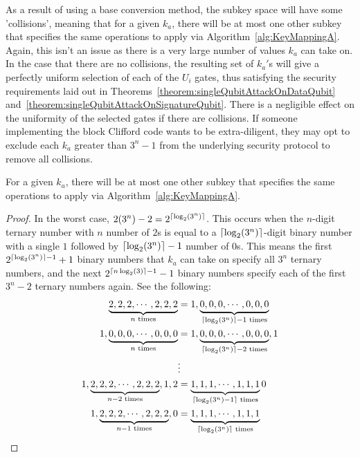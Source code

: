 As a result of using a base conversion method, the subkey space will have some 'collisions', meaning that for a given $k_a$, there will be at most one other subkey that specifies the same operations to apply via Algorithm~\ref{alg:KeyMappingA}. Again, this isn't an issue as there is a very large number of values $k_a$ can take on. In the case that there are no collisions, the resulting set of $k_a'$s will give a perfectly uniform selection of each of the $U_i$ gates, thus satisfying the security requirements laid out in Theorems~\ref{theorem:singleQubitAttackOnDataQubit} and~\ref{theorem:singleQubitAttackOnSignatureQubit}. There is a negligible effect on the uniformity of the selected gates if there are collisions. If someone implementing the block Clifford code wants to be extra-diligent, they may opt to exclude each $k_a$ greater than $3^n - 1$ from the underlying security protocol to remove all collisions.

\begin{theorem}
\label{theorem:collisionForMappingA}
For a given $k_a$, there will be at most one other subkey that specifies the same operations to apply via Algorithm~\ref{alg:KeyMappingA}.
\end{theorem}
\begin{proof}
In the worst case, $2(3^n) - 2 = 2^{\lceil\log_2 (3^n)\rceil}$. This occurs when the $n$-digit ternary number with $n$ number of $2$s is equal to a $\lceil\log_2 (3^n)\rceil$-digit binary number with a single $1$ followed by $\lceil\log_2 (3^n)\rceil - 1$ number of $0$s. This means the first $2^{\lceil\log_2 (3^n)\rceil - 1} + 1$ binary numbers that $k_a$ can take on specify all $3^n$ ternary numbers, and the next $2^{\lceil n \log_2 (3)\rceil - 1} - 1$ binary numbers specify each of the first $3^n - 2$ ternary numbers again. See the following:
\begin{align}
\underbrace{2, 2, 2, \cdots ,2,2,2}_{n \text{ times}} &= 1, \underbrace{0, 0, 0, \cdots ,0,0,0}_{\lceil\log_2 (3^n)\rceil - 1 \text{ times}}\\
1,\underbrace{0, 0, 0, \cdots ,0,0,0}_{n \text{ times}} &= 1, \underbrace{0, 0, 0, \cdots ,0,0,0}_{\lceil\log_2 (3^n)\rceil - 2 \text{ times}}, 1\\
& \vdots \nonumber \\
1, \underbrace{2, 2, 2, \cdots ,2,2,2}_{n-2 \text{ times}}, 1,2 &= \underbrace{1, 1, 1, \cdots ,1,1,1}_{\lceil\log_2 (3^n) - 1\rceil\text{ times}} 0\\
1, \underbrace{2, 2, 2, \cdots ,2,2,2}_{n-1 \text{ times}}, 0 &= \underbrace{1, 1, 1, \cdots ,1,1,1}_{\lceil\log_2 (3^n)\rceil\text{ times}}
\end{align}
\end{proof}

